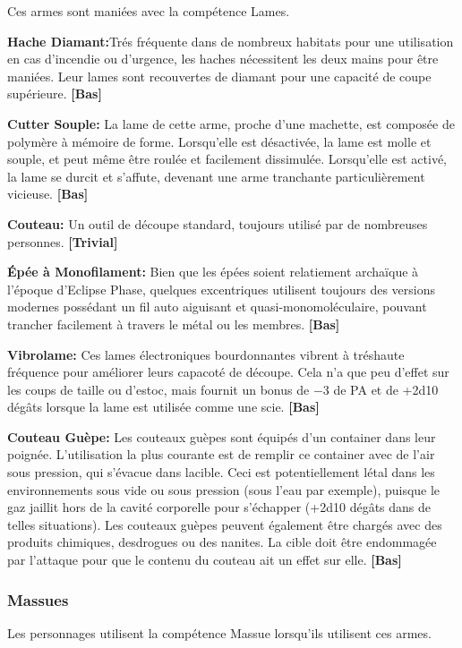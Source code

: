 Ces armes sont maniées avec la compétence Lames. 

\textbf{Hache Diamant:}Trés fréquente dans de nombreux habitats pour une utilisation en cas d'incendie ou d'urgence, les haches nécessitent les deux mains pour être maniées. Leur lames sont recouvertes de diamant pour une capacité de coupe supérieure. \textbf{[Bas]} 

\textbf{Cutter Souple:} La lame de cette arme, proche d'une machette, est composée de polymère à mémoire de forme. Lorsqu'elle est désactivée, la lame est molle et souple, et peut même être roulée et facilement dissimulée. Lorsqu'elle est activé, la lame se durcit et s'affute, devenant une arme tranchante particulièrement vicieuse. \textbf{[Bas]} 

\textbf{Couteau:} Un outil de découpe standard, toujours utilisé par de nombreuses personnes. \textbf{[Trivial]} 

\textbf{Épée à Monofilament:} Bien que les épées soient relatiement archaïque à l'époque d'Eclipse Phase, quelques excentriques utilisent toujours des versions modernes possédant un fil auto aiguisant et quasi-monomoléculaire, pouvant trancher facilement à travers le métal ou les membres. \textbf{[Bas]} 

\textbf{Vibrolame:} Ces lames électroniques bourdonnantes vibrent à tréshaute fréquence pour améliorer leurs capacoté de découpe. Cela n'a que peu d'effet sur les coups de taille ou d'estoc, mais fournit un bonus de $-$3 de PA et de +2d10 dégâts lorsque la lame est utilisée comme une scie. \textbf{[Bas]} 

\textbf{Couteau Guèpe:} Les couteaux guèpes sont équipés d'un container dans leur poignée. L'utilisation la plus courante est de remplir ce container avec de l'air sous pression, qui s'évacue dans lacible. Ceci est potentiellement létal dans les environnements sous vide ou sous pression (sous l'eau par exemple), puisque le gaz jaillit hors de la cavité corporelle pour s'échapper (+2d10 dégâts dans de telles situations). Les couteaux guèpes peuvent également être chargés avec des produits chimiques, desdrogues ou des nanites. La cible doit être endommagée par l'attaque pour que le contenu du couteau ait un effet sur elle. \textbf{[Bas]} 

\subsubsection{Massues} 

Les personnages  utilisent la compétence Massue lorsqu'ils utilisent ces armes. 

